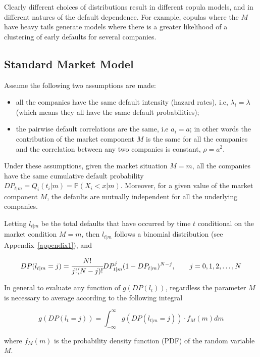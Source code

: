 Clearly different choices of distributions result in different copula models, and in different natures of the default dependence. For example, copulas where the \(M\) have heavy tails generate models where there is a
greater likelihood of a clustering of early defaults for several
companies.

\subsection{Standard Market Model}\label{standard-market-model}

Assume the following two assumptions are made:

\begin{itemize}
	\tightlist
	\item
	all the companies have the same default intensity (hazard rates), i.e, \(\lambda_i = \lambda\) (which means they all have the same default probabilities);
	\item
	the pairwise default correlations are the same, i.e \(a_i = a\); in other words the contribution of the market
	component $M$ is the same for all the companies and the correlation between any two companies is constant, \(\rho = a^2\).
\end{itemize}

Under these assumptions, given the market situation \(M = m\), all the
companies have the same cumulative default probability
\(DP_{t|m}=Q_i(t_i|m)=\mathbb{P}(X_i < x|m)\). 
Moreover, for a given value of the
market component \(M\), the defaults are mutually independent for all
the underlying companies. 

Letting \(l_{t|m}\) be the total defaults that
have occurred by time \(t\) conditional on the market condition
\(M = m\), then \(l_{t|m}\) follows a binomial distribution (see Appendix~\ref{appendix1}), and

\[DP(l_{t|m} = j) = \cfrac{N!}{j!(N-j)!}DP^j_{t|m}(1-DP_{t|m})^{N-j},\qquad  j=0, 1, 2,\ldots,N\]

In general to evaluate any function of $g(DP(l_t))$, regardless the parameter $M$ is necessary to average according to the following integral

\begin{equation}
g(DP(l_{t} = j)) = \int_{-\infty}^{\infty}{g(DP(l_{t|m} = j))\cdot f_M(m)dm}
\label{eq:gaussian_quadrature}
\end{equation}

where $f_M(m)$ is the probability density function (PDF) of the random variable $M$.

